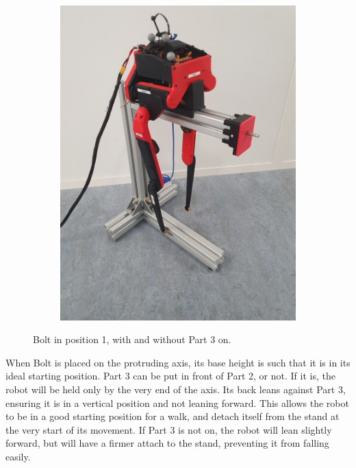 \documentclass[a4paper,10pt]{article}
\begin{document}
\begin{figure}[H]
\begin{subfigure}{.5\textwidth}
  \includegraphics[width=1\linewidth, angle=0, scale=0.8]{./images/Bolt_stand_2.jpg}
\end{subfigure}
\caption{Bolt in position 1, with and without Part 3 on.}
\label{fig:bolt_in_position_1}
\end{figure}

When Bolt is placed on the protruding axis, its base height is such that it is in its ideal starting position. Part 3 can be put in front of Part 2, or not. If it is, the robot will be held only by the very end of the axis. Its back leans against Part 3, ensuring it is in a vertical position and not leaning forward. This allows the robot to be in a good starting position for a walk, and detach itself from the stand at the very start of its movement. If Part 3 is not on, the robot will lean slightly forward, but will have a firmer attach to the stand, preventing it from falling easily.\\

\vspace{5mm}
\end{document}
